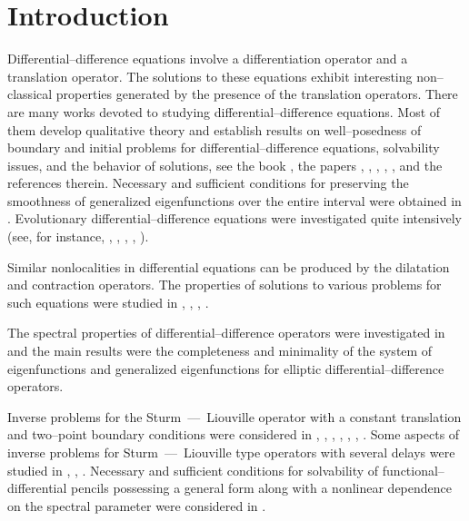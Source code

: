\documentclass[10pt, a4paper]{article}
\theoremstyle{plain}
\theoremstyle{definition}
\numberwithin{equation}{section}
\begin{document}
\normalsize
\sloppy
\vspace{5pt}

\section{Introduction}

Differential--difference equations involve a differentiation operator  and  a translation operator. %
The solutions to these equations exhibit interesting non--classical properties generated by the presence of the translation operators. %
There are many works devoted to studying differential--difference equations.
Most of them develop qualitative theory and establish results on well--posedness of boundary and initial
problems for differential--difference equations, solvability issues, and the
behavior of solutions, see the book \cite{Skub_Book}, the papers
\cite{SkubUMN}, \cite{NevSkub}, \cite{SkubMathNach}, \cite{LiikoSkub},
\cite{Muravnik11}, \cite{Kamenskii} and the references therein.
Necessary and sufficient conditions for preserving the smoothness of
generalized eigenfunctions over the entire interval were obtained in \cite{VorotSkub}.
Evolutionary differential--difference equations were investigated quite intensively (see,
for instance, \cite{Muravnik1}, \cite{Muravnik2}, \cite{Muravnik3}, \cite{Muravnik4},
\cite{Muravnik5}).

Similar nonlocalities in differential equations can be produced by the
  dilatation and contraction operators. The properties of solutions to various
problems for such equations were studied in \cite{Rosov1}, \cite{Rosov2},
\cite{Rosov3}, \cite{Rosov4}.

The spectral properties of differential--difference operators
were investigated in \cite{SkubUMN} and the main results  were the completeness
and minimality of the system of eigenfunctions and generalized eigenfunctions
for elliptic differential--difference operators.


Inverse problems for the Sturm~---~Liouville operator with a constant translation and two--point
boundary conditions were considered in \cite{FreilingYurko}, \cite{Yang},
\cite{Bond_Yurko}, \cite{DjuricVladicic}, \cite{WangShiehMiao}, \cite{DjuricButerin1},
\cite{DjuricButerin2}. Some aspects of inverse problems for Sturm~---~Liouville type
operators with several delays were studied in \cite{Shahriari1}, \cite{Shahriari2},
\cite{VojvodicPikula}. Necessary and sufficient conditions for solvability of
functional--differential pencils possessing a general form along with a nonlinear
dependence on the spectral parameter were considered in \cite{ButerinMalShieh}.
\end{document}
